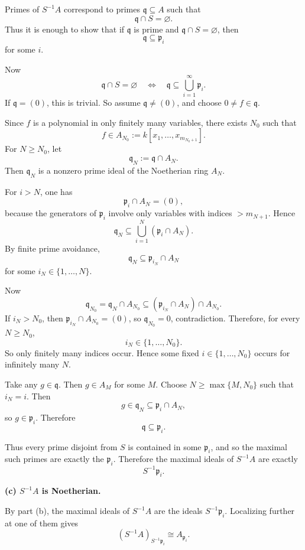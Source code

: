 \documentclass[12pt,a4paper]{article}
\theoremstyle{plain}
\theoremstyle{definition}      %
\begin{document}
	Primes of \(S^{-1}A\) correspond to primes \(\mathfrak q\subseteq A\) such that
	\[
	\mathfrak q\cap S=\varnothing.
	\]
	Thus it is enough to show that if \(\mathfrak q\) is prime and \(\mathfrak q\cap S=\varnothing\), then
	\[
	\mathfrak q\subseteq \mathfrak p_i
	\]
	for some \(i\).
	
	Now
	\[
	\mathfrak q\cap S=\varnothing
	\quad\Longleftrightarrow\quad
	\mathfrak q\subseteq \bigcup_{i=1}^{\infty}\mathfrak p_i.
	\]
	If \(\mathfrak q=(0)\), this is trivial. So assume \(\mathfrak q\neq (0)\), and choose \(0\neq f\in\mathfrak q\).
	
	Since \(f\) is a polynomial in only finitely many variables, there exists \(N_0\) such that
	\[
	f\in A_{N_0}:=k[x_1,\dots,x_{m_{N_0+1}}].
	\]
	For \(N\ge N_0\), let
	\[
	\mathfrak q_N:=\mathfrak q\cap A_N.
	\]
	Then \(\mathfrak q_N\) is a nonzero prime ideal of the Noetherian ring \(A_N\).
	
	For \(i>N\), one has
	\[
	\mathfrak p_i\cap A_N=(0),
	\]
	because the generators of \(\mathfrak p_i\) involve only variables with indices \(>m_{N+1}\). Hence
	\[
	\mathfrak q_N\subseteq \bigcup_{i=1}^{N}(\mathfrak p_i\cap A_N).
	\]
	By finite prime avoidance,
	\[
	\mathfrak q_N\subseteq \mathfrak p_{i_N}\cap A_N
	\]
	for some \(i_N\in\{1,\dots,N\}\).
	
	Now
	\[
	\mathfrak q_{N_0}
	=
	\mathfrak q_N\cap A_{N_0}
	\subseteq
	(\mathfrak p_{i_N}\cap A_N)\cap A_{N_0}.
	\]
	If \(i_N>N_0\), then \(\mathfrak p_{i_N}\cap A_{N_0}=(0)\), so \(\mathfrak q_{N_0}=0\), contradiction. Therefore, for every \(N\ge N_0\),
	\[
	i_N\in\{1,\dots,N_0\}.
	\]
	So only finitely many indices occur. Hence some fixed \(i\in\{1,\dots,N_0\}\) occurs for infinitely many \(N\).
	
	Take any \(g\in\mathfrak q\). Then \(g\in A_M\) for some \(M\). Choose \(N\ge \max\{M,N_0\}\) such that \(i_N=i\). Then
	\[
	g\in \mathfrak q_N\subseteq \mathfrak p_i\cap A_N,
	\]
	so \(g\in \mathfrak p_i\). Therefore
	\[
	\mathfrak q\subseteq \mathfrak p_i.
	\]
	
	Thus every prime disjoint from \(S\) is contained in some \(\mathfrak p_i\), and so the maximal such primes are exactly the \(\mathfrak p_i\). Therefore the maximal ideals of \(S^{-1}A\) are exactly
	\[
	S^{-1}\mathfrak p_i.
	\]
	
	\medskip
	
	\textbf{(c) \(S^{-1}A\) is Noetherian.}
	
	By part (b), the maximal ideals of \(S^{-1}A\) are the ideals \(S^{-1}\mathfrak p_i\). Localizing further at one of them gives
	\[
	(S^{-1}A)_{S^{-1}\mathfrak p_i}\cong A_{\mathfrak p_i}.
	\]
	
\end{document}
